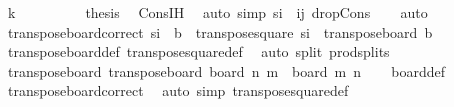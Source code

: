 \begin{isabellebody}
\ {\isachardoublequoteopen}k\ {\isachargreater}{\kern0pt}\ {}{\isachardoublequoteclose}\isanewline
\ \ \ \ \isamarkupfalse%
\ \isamarkupfalse%
\ {\isacharquery}{\kern0pt}thesis\ \isamarkupfalse%
\ Cons{\isachardot}{\kern0pt}IH\ \isamarkupfalse%
\ {\isacharparenleft}{\kern0pt}auto\ simp{\isacharcolon}{\kern0pt}\ {\isacartoucheopen}s\isactrlsub i\ {\isacharequal}{\kern0pt}\ {\isacharparenleft}{\kern0pt}i{\isacharcomma}{\kern0pt}j{\isacharparenright}{\kern0pt}{\isacartoucheclose}\ drop{\isacharunderscore}{\kern0pt}Cons{\isacharprime}{\kern0pt}{\isacharparenright}{\kern0pt}\isanewline
\ \ \isamarkupfalse%
\ auto\isanewline
{}\isamarkupfalse%
%
\endisatagproof
{\isafoldproof}%
%
\isadelimproof
\isanewline
%
\endisadelimproof
\isanewline
{}\isamarkupfalse%
\ transpose{\isacharunderscore}{\kern0pt}board{\isacharunderscore}{\kern0pt}correct{\isacharcolon}{\kern0pt}\ {\isachardoublequoteopen}s\isactrlsub i\ {\isasymin}\ b\ {\isasymlongleftrightarrow}\ {\isacharparenleft}{\kern0pt}transpose{\isacharunderscore}{\kern0pt}square\ s\isactrlsub i{\isacharparenright}{\kern0pt}\ {\isasymin}\ transpose{\isacharunderscore}{\kern0pt}board\ b{\isachardoublequoteclose}\isanewline
%
\isadelimproof
\ \ %
\endisadelimproof
%
\isatagproof
{}\isamarkupfalse%
\ transpose{\isacharunderscore}{\kern0pt}board{\isacharunderscore}{\kern0pt}def\ transpose{\isacharunderscore}{\kern0pt}square{\isacharunderscore}{\kern0pt}def\ \isamarkupfalse%
\ {\isacharparenleft}{\kern0pt}auto\ split{\isacharcolon}{\kern0pt}\ prod{\isachardot}{\kern0pt}splits{\isacharparenright}{\kern0pt}%
\endisatagproof
{\isafoldproof}%
%
\isadelimproof
\isanewline
%
\endisadelimproof
\isanewline
{}\isamarkupfalse%
\ transpose{\isacharunderscore}{\kern0pt}board{\isacharcolon}{\kern0pt}\ {\isachardoublequoteopen}transpose{\isacharunderscore}{\kern0pt}board\ {\isacharparenleft}{\kern0pt}board\ n\ m{\isacharparenright}{\kern0pt}\ {\isacharequal}{\kern0pt}\ board\ m\ n{\isachardoublequoteclose}\isanewline
%
\isadelimproof
\ \ %
\endisadelimproof
%
\isatagproof
{}\isamarkupfalse%
\ board{\isacharunderscore}{\kern0pt}def\ \isamarkupfalse%
\ transpose{\isacharunderscore}{\kern0pt}board{\isacharunderscore}{\kern0pt}correct\ \isamarkupfalse%
\ {\isacharparenleft}{\kern0pt}auto\ simp{\isacharcolon}{\kern0pt}\ transpose{\isacharunderscore}{\kern0pt}square{\isacharunderscore}{\kern0pt}def{\isacharparenright}{\kern0pt}%

\end{isabellebody}
